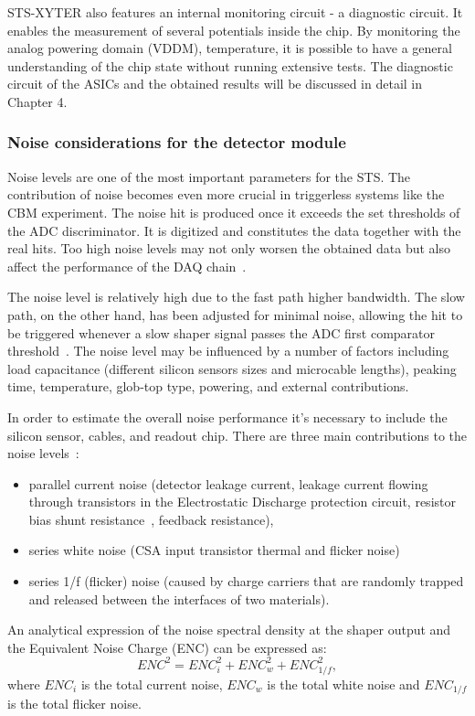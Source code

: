 STS-XYTER also features an internal monitoring circuit - a diagnostic circuit. It enables the measurement of several potentials inside the chip. By monitoring the analog powering domain (VDDM), temperature, it is possible to have a general understanding of the chip state without running extensive tests. The diagnostic circuit of the \glspl{ASIC} and the obtained results will be discussed in detail in Chapter 4.
\subsubsection{Noise considerations for the detector module}
Noise levels are one of the most important parameters for the \gls{STS}. The contribution of noise becomes even more crucial in triggerless systems like the \gls{CBM} experiment. The noise hit is produced once it exceeds the set thresholds of the \gls{ADC} discriminator. It is digitized and constitutes the data together with the real hits. Too high noise levels may not only worsen the obtained data but also affect the performance of the \gls{DAQ} chain~\cite{Heuser:54798}.

The noise level is relatively high due to the fast path higher bandwidth. The slow path, on the other hand, has been adjusted for minimal noise, allowing the hit to be triggered whenever a slow shaper signal passes the ADC first comparator threshold~\cite{RodriguezRodriguez2020}. The noise level may be influenced by a number of factors including load capacitance 
(different silicon sensors sizes and microcable lengths), peaking time, temperature, glob-top type, powering, and external contributions.

In order to estimate the overall noise performance it's necessary to include the silicon sensor, cables, and readout chip. There are three main contributions to the noise levels~\cite{Toia:209729}:
\begin{itemize}
    \item parallel current noise (detector leakage current, leakage current flowing through transistors in the Electrostatic Discharge protection circuit, resistor bias shunt resistance~\cite{Spieler}, feedback resistance),
    \item series white noise (\gls{CSA} input transistor thermal and flicker noise)
    \item series 1/f (flicker) noise (caused by charge carriers that are randomly trapped and released between the interfaces of two materials).
\end{itemize}
An analytical expression of the noise spectral density at the shaper output and the Equivalent Noise Charge (\gls{ENC}) can be expressed as:
\begin{equation}
    ENC^{2} = ENC^{2}_{i} + ENC^{2}_{w} + ENC^{2}_{1/f},
\end{equation}
where $ENC_{i}$  is the total current noise, $ ENC_{w}$ is the total white noise and $ENC_{1/f}$ is the total flicker noise. 

